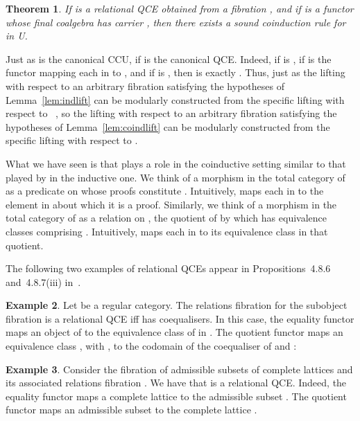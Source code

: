 \documentclass{LMCS}
\theoremstyle{plain}
\newtheorem{theorem}{Theorem}[section]
\theoremstyle{remark}
\theoremstyle{definition}
\newtheorem{example}[theorem]{Example}
\begin{document}
\begin{theorem}\label{thm:coinda}
If  is a relational QCE obtained from a
fibration , and if  is a functor whose
final coalgebra has carrier , then there exists a sound
coinduction rule for  in U.
\end{theorem}

Just as  is the canonical CCU, if  is the
canonical QCE. Indeed, if  is , if
 is the functor mapping each  in  to , and if
 is , then  is exactly
. Thus, just as the lifting  with respect to an
arbitrary fibration  satisfying the hypotheses of
Lemma~\ref{lem:indlift} can be modularly constructed from the specific
lifting  with respect to ~\cite{gjf10}, so the
lifting  with respect to an arbitrary fibration 
satisfying the hypotheses of Lemma~\ref{lem:coindlift} can be
modularly constructed from the specific lifting  with respect
to .

What we have seen is that  plays a role in the
coinductive setting similar to that played by  in the
inductive one. We think of a morphism  in the total
category of  as a predicate on  whose proofs
constitute . Intuitively,  maps each  in  to the element
 in  about which it is a proof. Similarly, we think of a
morphism  in the total category of  as a
relation on , the quotient of  by which has equivalence classes
comprising . Intuitively,  maps each  in  to its
equivalence class in that quotient.

The following two examples of relational QCEs appear in
Propositions~4.8.6 and~4.8.7(iii) in~\cite{jac99}.

\begin{example}
  Let  be a regular category. The relations fibration for the
  subobject fibration  is a relational QCE iff 
  has coequalisers. In this case, the equality functor maps an object
   of  to the equivalence class of  in
  . The quotient functor maps an equivalence class ,
  with , to the codomain
   of the coequaliser  of  and :
  
  \end{example}
  
  \begin{example}
    Consider the fibration  of admissible subsets of
    complete lattices and its associated relations fibration
    .  We have that  is a relational
    QCE. Indeed, the equality functor  maps a
    complete lattice  to the admissible subset .  The quotient functor
       maps an admissible subset  to the complete lattice .
  \end{example}
\end{document}
